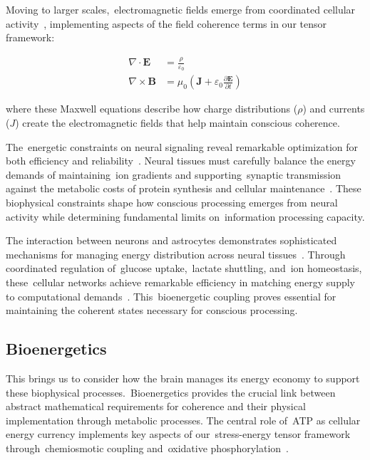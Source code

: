 Moving to larger scales,~electromagnetic fields emerge from coordinated cellular activity~\cite{hunt2024electromagnetic}, implementing aspects of the field coherence terms in our tensor framework:

\begin{align}
    \nabla \cdot \mathbf{E}  & = \frac{\rho}{\varepsilon_0}                                              \\
    \nabla \times \mathbf{B} & = \mu_0(\mathbf{J} + \varepsilon_0\frac{\partial \mathbf{E}}{\partial t})
\end{align}

where these Maxwell equations describe how charge distributions ($\rho$) and currents ($J$) create the electromagnetic fields that help maintain conscious coherence.

The~energetic constraints on neural signaling reveal remarkable optimization for both efficiency and reliability~\cite{Attwell2001, Sengupta2014}. Neural tissues must carefully balance the energy demands of maintaining~ion gradients and supporting~synaptic transmission against the metabolic costs of protein synthesis and cellular maintenance~\cite{Harris2012}. These biophysical constraints shape how conscious processing emerges from neural activity while determining fundamental limits on~information processing capacity.

The interaction between neurons and astrocytes demonstrates sophisticated mechanisms for managing energy distribution across neural tissues~\cite{Hertz2007, Pellerin2012}. Through coordinated regulation of~glucose uptake,~lactate shuttling, and~ion homeostasis, these~cellular networks achieve remarkable efficiency in matching energy supply to computational demands~\cite{Magistretti2015}. This~bioenergetic coupling proves essential for maintaining the coherent states necessary for conscious processing.

\subsection*{Bioenergetics}

This brings us to consider how the brain manages its energy economy to support these biophysical processes.~Bioenergetics provides the crucial link between abstract mathematical requirements for coherence and their physical implementation through metabolic processes. The central role of~ATP as cellular energy currency implements key aspects of our~stress-energy tensor framework through~chemiosmotic coupling and~oxidative phosphorylation~\cite{Mitchell1961, Nicholls2013}.

